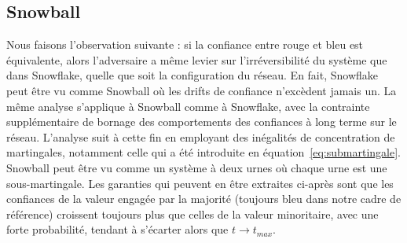 \documentclass[letterpaper,twocolumn,10pt]{article}
\theoremstyle{definition}
\begin{document}
\begin{appendices}
\subsection{Snowball}
Nous faisons l'observation suivante : si la confiance entre rouge et bleu est équivalente, alors l'adversaire a même levier %
sur l'irréversibilité du système que dans Snowflake, quelle que soit la configuration du réseau. En fait, Snowflake peut être vu comme Snowball où les drifts %
de confiance n'excèdent jamais un. La même analyse s'applique à Snowball comme à Snowflake, avec la contrainte supplémentaire de bornage des comportements des confiances à long terme sur le réseau. L'analyse suit à cette fin en employant des inégalités de concentration de martingales, notamment celle qui a été introduite en équation~\ref{eq:submartingale}. Snowball peut être vu comme un système à deux urnes où chaque urne est une sous-martingale. Les garanties qui peuvent en être extraites ci-après sont que les confiances de la valeur engagée par la majorité (toujours bleu dans notre cadre de référence) croissent toujours plus que celles de la valeur minoritaire, avec une forte probabilité, tendant à s'écarter alors que $t \rightarrow t_{max}$. %

\end{appendices}
\end{document}
